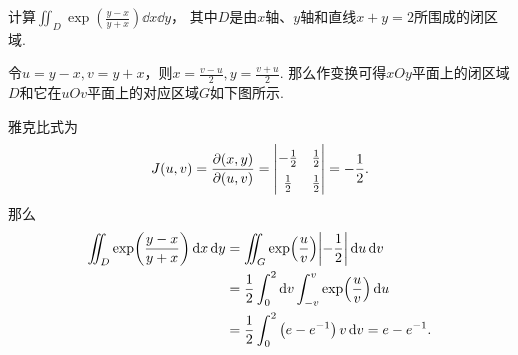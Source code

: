 \begin{example}
计算\(\iint_D \exp(\frac{y-x}{y+x}) \dd{x} \dd{y}\)，
其中\(D\)是由\(x\)轴、\(y\)轴和直线\(x+y=2\)所围成的闭区域.
\begin{solution}
令\(u = y-x, v = y+x\)，则\(x = \frac{v-u}{2}, y = \frac{v+u}{2}\).
那么作变换可得\(xOy\)平面上的闭区域\(D\)和它在\(uOv\)平面上的对应区域\(G\)如下图所示.

\begin{figure}[ht]
	\def\subwidth{.5\linewidth}
	\begin{subfigure}[b]{\subwidth}
		\centering
		\subcaption{}
	\end{subfigure}%
	\begin{subfigure}[b]{\subwidth}
		\centering
		\subcaption{}
	\end{subfigure}%
	\caption{}
\end{figure}

雅克比式为\[
	J(u,v)
	= \jacobi{x,y}{u,v}
	= \def\arraystretch{1.5} \begin{vmatrix}
	-\frac12 & \frac12 \\
	\frac12 & \frac12
	\end{vmatrix}
	= - \frac12.
\]
那么\begin{align*}
	\iint_D \exp(\frac{y-x}{y+x}) \dd{x} \dd{y}
	&= \iint_G \exp(\frac{u}{v}) \abs{-\frac12} \dd{u} \dd{v} \\
	&= \frac12 \int_0^2 \dd{v} \int_{-v}^v \exp(\frac{u}{v}) \dd{u} \\
	&= \frac12 \int_0^2 \left( e - e^{-1} \right) v \dd{v}
	= e - e^{-1}.
\end{align*}
\end{solution}
\end{example}

